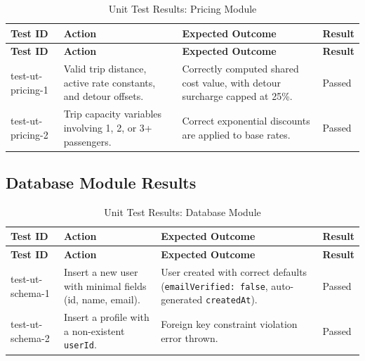 \small
\begin{longtable}{|p{}|>{\raggedright\arraybackslash}p{}|>{\raggedright\arraybackslash}p{}|p{}|}
\hline
\textbf{Test ID} & \textbf{Action} & \textbf{Expected Outcome} & \textbf{Result} \\
\hline
\endfirsthead

\hline
\textbf{Test ID} & \textbf{Action} & \textbf{Expected Outcome} & \textbf{Result} \\
\hline
\endhead

\hline
\endfoot

\hline
\caption{Unit Test Results: Pricing Module}
\endlastfoot

test-ut-pricing-1 & Valid trip distance, active rate constants, and detour offsets. & Correctly computed shared cost value, with detour surcharge capped at 25\%. & Passed \\
\hline
test-ut-pricing-2 & Trip capacity variables involving 1, 2, or 3+ passengers. & Correct exponential discounts are applied to base rates. & Passed \\
\hline
\end{longtable}

\subsection{Database Module Results}

\small
\begin{longtable}{|p{}|>{\raggedright\arraybackslash}p{}|>{\raggedright\arraybackslash}p{}|p{}|}
\hline
\textbf{Test ID} & \textbf{Action} & \textbf{Expected Outcome} & \textbf{Result} \\
\hline
\endfirsthead

\hline
\textbf{Test ID} & \textbf{Action} & \textbf{Expected Outcome} & \textbf{Result} \\
\hline
\endhead

\hline
\endfoot

\hline
\caption{Unit Test Results: Database Module}
\endlastfoot

test-ut-schema-1 & Insert a new user with minimal fields (id, name, email). & User created with correct defaults (\texttt{emailVerified: false}, auto-generated \texttt{createdAt}). & Passed \\
\hline
test-ut-schema-2 & Insert a profile with a non-existent \texttt{userId}. & Foreign key constraint violation error thrown. & Passed \\
\hline
\end{longtable}

